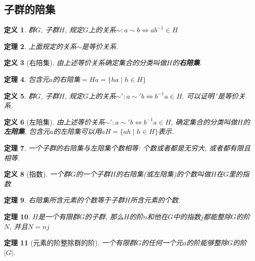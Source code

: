 \documentclass[UTF8]{ctexart}
\newtheorem{Definition}{定义}%
\newtheorem{Theorem}[Definition]{定理}
\begin{document}
\subsection{子群的陪集}

\begin{Definition}
群$G$, 子群$H$, 规定$G$上的关系$\sim: a \sim b \Leftrightarrow a b^{-1} \in H$
\end{Definition}

\begin{Theorem}
上面规定的关系$\sim$是等价关系.
\end{Theorem}

\begin{Definition}[右陪集]
由上述等价关系确定集合的分类叫做$H$的\textbf{右陪集}.
\end{Definition}

\begin{Theorem}
包含元$a$的右陪集$ = Ha =  \{ ha \mid h \in H \}$
\end{Theorem}

\begin{Definition}
群$G$, 子群$H$, 规定$G$上的关系$\sim': a \sim 'b \Leftrightarrow b^{-1} a \in H$. 可以证明$~'$是等价关系.
\end{Definition}

\begin{Definition}[左陪集]
由上述等价关系$\sim': a \sim' b \Leftrightarrow b^{-1} a \in H$, 确定集合的分类叫做$H$的\textbf{左陪集}, 包含元$a$的左陪集可以用$aH = \{ ah \mid h \in H \}$表示.
\end{Definition}

\begin{Theorem}
一个子群的右陪集与左陪集个数相等: 个数或者都是无穷大, 或者都有限且相等.
\end{Theorem}

\begin{Definition}[指数]
一个群$G$的一个子群$H$的右陪集(或左陪集)的个数叫做$H$在$G$里的指数.
\end{Definition}

\begin{Theorem}
右陪集所含元素的个数等于子群$H$所含元素的个数.
\end{Theorem}

\begin{Theorem}
$H$是一个有限群$G$的子群, 那么$H$的阶$n$和他在$G$中的指数$j$都能整除$G$的阶$N$, 并且$N = nj$
\end{Theorem}

\begin{Theorem}[元素的阶整除群的阶]
一个有限群$G$的任何一个元$a$的阶能够整除$G$的阶$|G|$.
\end{Theorem}
\end{document}
